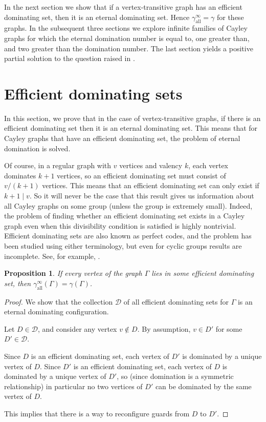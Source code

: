 \documentclass{amsart}
\newtheorem{prop}[thm]{Proposition}
\theoremstyle{remark}
\theoremstyle{definition}
\newcommand{\etdom}{\gamma_{\mathrm{all}}^\infty}
\begin{document}
In the next section we show that if a vertex-transitive graph has an efficient dominating set, then it is an eternal dominating set.  Hence $\etdom = \gamma$ for these graphs.  In the subsequent three sections we explore infinite families of Cayley graphs for which the eternal domination number is equal to, one greater than, and two greater than the domination number.  The last section yields a positive partial solution to the question raised in \cite{BSL2016}.


\section{Efficient dominating sets}

In this section, we prove that in the case of vertex-transitive graphs, if there is an efficient dominating set then it is an eternal dominating set. This means that for Cayley graphs that have an efficient dominating set, the problem of eternal domination is solved.

Of course, in a regular graph with $v$ vertices and valency $k$, each vertex dominates $k+1$ vertices, so an efficient dominating set must consist of $v/(k+1)$ vertices. This means that an efficient dominating set can only exist if $k+1 \mid v$. So it will never be the case that this result gives us information about all Cayley graphs on some group (unless the group is extremely small). Indeed, the problem of finding whether an efficient dominating set exists in a Cayley graph even when this divisibility condition is satisfied is highly nontrivial. Efficient dominating sets are also known as perfect codes, and the problem has been studied using either terminology, but even for cyclic groups results are incomplete. See, for example, \cite{CM2013,DSLW2017,D2014,FHZ2017,FHKL2025,KM2013}.

\begin{prop}\label{prop:efficient}
    If every vertex of the graph $\Gamma$ lies in some efficient dominating set, then $\etdom(\Gamma)=\gamma(\Gamma)$.
\end{prop}

\begin{proof}
    We show that the collection $\mathcal D$ of all efficient dominating sets for $\Gamma$ is an eternal dominating configuration.
    
    Let $D\in \mathcal D$, and consider any vertex $v \notin D$. By assumption, $v \in D'$ for some $D' \in \mathcal D$.

    Since $D$ is an efficient dominating set, each vertex of $D'$ is dominated by a unique vertex of $D$. Since $D'$ is an efficient dominating set, each vertex of $D$ is dominated by a unique vertex of $D'$, so (since domination is a symmetric relationship) in particular no two vertices of $D'$ can be dominated by the same vertex of $D$.

    This implies that there is a way to reconfigure guards from $D$ to $D'$. 
\end{proof}
\end{document}
